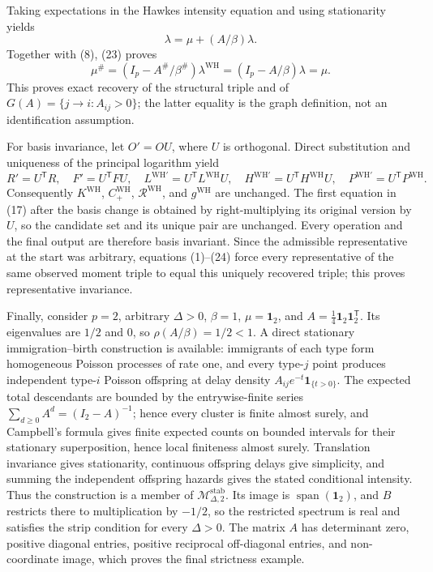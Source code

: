 Taking expectations in the Hawkes intensity equation and using stationarity yields
\[
 \lambda=\mu+(A/\beta)\lambda.
\tag{23}
\]
Together with (8), (23) proves
\[
 \mu^{\#}=(I_p-A^{\#}/\beta^{\#})\lambda^{\mathrm{WH}}
 =(I_p-A/\beta)\lambda=\mu.
\tag{24}
\]
This proves exact recovery of the structural triple and of \(G(A)=\{j\to i:A_{ij}>0\}\); the latter equality is the graph definition, not an identification assumption.

For basis invariance, let \(O'=OU\), where \(U\) is orthogonal.  Direct substitution and uniqueness of the principal logarithm yield
\[
 R'=U^{\mathsf T}R,\quad F'=U^{\mathsf T}FU,\quad
 L^{\mathrm{WH}\prime}=U^{\mathsf T}L^{\mathrm{WH}}U,\quad
 H^{\mathrm{WH}\prime}=U^{\mathsf T}H^{\mathrm{WH}}U,\quad
 P^{\mathrm{WH}\prime}=U^{\mathsf T}P^{\mathrm{WH}}.
\tag{25}
\]
Consequently \(K^{\mathrm{WH}}\), \(C_{+}^{\mathrm{WH}}\), \(\mathcal R^{\mathrm{WH}}\), and \(g^{\mathrm{WH}}\) are unchanged.  The first equation in (17) after the basis change is obtained by right-multiplying its original version by \(U\), so the candidate set and its unique pair are unchanged.  Every operation and the final output are therefore basis invariant.  Since the admissible representative at the start was arbitrary, equations (1)--(24) force every representative of the same observed moment triple to equal this uniquely recovered triple; this proves representative invariance.

Finally, consider \(p=2\), arbitrary \(\Delta>0\), \(\beta=1\), \(\mu=\mathbf 1_2\), and \(A=\tfrac14\mathbf 1_2\mathbf 1_2^{\mathsf T}\).  Its eigenvalues are \(1/2\) and \(0\), so \(\rho(A/\beta)=1/2<1\).  A direct stationary immigration--birth construction is available: immigrants of each type form homogeneous Poisson processes of rate one, and every type-\(j\) point produces independent type-\(i\) Poisson offspring at delay density \(A_{ij}e^{-t}\mathbf 1_{\{t>0\}}\).  The expected total descendants are bounded by the entrywise-finite series \(\sum_{d\geq0}A^d=(I_2-A)^{-1}\); hence every cluster is finite almost surely, and Campbell's formula gives finite expected counts on bounded intervals for their stationary superposition, hence local finiteness almost surely.  Translation invariance gives stationarity, continuous offspring delays give simplicity, and summing the independent offspring hazards gives the stated conditional intensity.  Thus the construction is a member of \(\mathcal M_{\Delta,2}^{\mathrm{stab}}\).  Its image is \(\operatorname{span}(\mathbf 1_2)\), and \(B\) restricts there to multiplication by \(-1/2\), so the restricted spectrum is real and satisfies the strip condition for every \(\Delta>0\).  The matrix \(A\) has determinant zero, positive diagonal entries, positive reciprocal off-diagonal entries, and non-coordinate image, which proves the final strictness example.